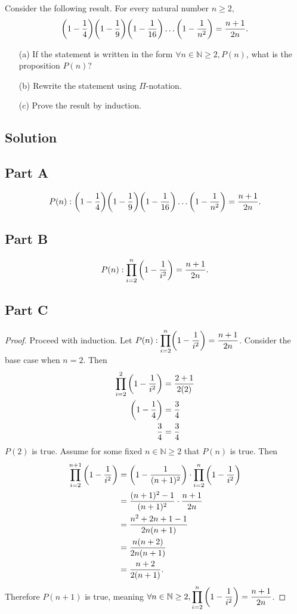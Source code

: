 \documentclass[12pt]{extarticle}
\begin{document}
Consider the following result. For every natural number $n \geq 2,$
\[
	\qty(1 - \frac{1}{4}) \qty(1 - \frac{1}{9}) \qty(1 - \frac{1}{16}) \ldots \qty(1 - \frac{1}{n^2}) = \frac{n+1}{2n}
.\]

\begin{enumerate}
	\item[(a)] If the statement is written in the form $\forall n \in\mathbb{N} \geq 2, P(n)$, what is the proposition $P(n)$?
	\item[(b)] Rewrite the statement using $\Pi$-notation.
	\item[(c)] Prove the result by induction.
\end{enumerate}

\subsection*{Solution}
\subsection*{Part A}

\[
	P(n): \qty(1 - \frac{1}{4}) \qty(1 - \frac{1}{9}) \qty(1 - \frac{1}{16}) \ldots \qty(1 - \frac{1}{n^2}) = \frac{n+1}{2n}
.\]

\subsection*{Part B}

\[
	P(n) : \prod_{i = 2}^n \qty(1-\frac{1}{i^2}) = \frac{n+1}{2n}
.\]

\subsection*{Part C}

\begin{proof}
	Proceed with induction. Let $P(n) : \displaystyle{\prod_{i = 2}^n} \qty(1-\frac{1}{i^2}) = \frac{n+1}{2n}$. Consider the base case when $n = 2$. Then
	\begin{align*}
		\prod_{i = 2}^2 \qty(1-\frac{1}{i^2}) &= \frac{2+1}{2(2)} \\
		\qty(1 - \frac{1}{4})  &= \frac{3}{4} \\
		\frac{3}{4} &= \frac{3}{4} \\
	\end{align*}
	$P(2)$ is true. Assume for some fixed $n \in \mathbb{N} \geq 2$ that $P(n)$ is true. Then
	\begin{align*}
		\prod_{i = 2}^{n+1} \qty(1-\frac{1}{i^2}) &= \qty(1 - \frac{1}{(n+1)^2}) \cdot \prod_{i = 2}^n \qty(1-\frac{1}{i^2}) \\
		&= \frac{(n+1)^2 - 1}{(n+1)^2} \cdot \frac{n + 1}{2n} \\
		&= \frac{n^2 + 2n + 1 - 1}{2n (n+1)} \\
		&= \frac{n(n + 2)}{2n (n+1)} \\
		&= \frac{n + 2}{2 (n+1)}
	.\end{align*}
	Therefore $P(n+1)$ is true, meaning $\forall n \in\mathbb{N} \geq 2, \displaystyle\prod_{i = 2}^n \qty(1-\frac{1}{i^2}) = \frac{n+1}{2n}$.
\end{proof}
\end{document}
